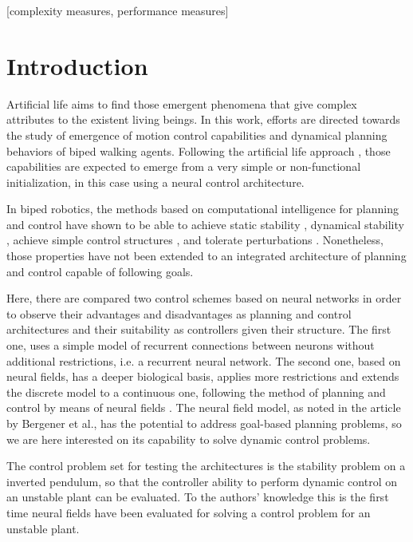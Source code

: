 \documentclass{sig-alternate}
\begin{document}
[complexity measures, performance measures]



\section{Introduction}
Artificial life aims to find those emergent phenomena that give
complex attributes to the existent living beings. In this work,
efforts are directed towards the study of emergence of motion control
capabilities and dynamical planning behaviors of biped walking
agents. Following the artificial life approach
\cite{Nolfi04Evolutionary}, those capabilities are expected to emerge
from a very simple or non-functional initialization, in this case
using a neural control architecture.

In biped robotics, the methods based on computational intelligence for
planning and control have shown to be able to achieve static
stability \cite{Kun97Adaptive}, dynamical stability
\cite{Nakanishi2004b,Komatsu05Dynamic}, achieve simple control
structures \cite{Huelse04Structure}, and tolerate perturbations
\cite{Juang02Intelligent}. Nonetheless, those properties have not been
extended to an integrated architecture of planning and control capable
of following goals.

Here, there are compared two control schemes based on neural networks
in order to observe their advantages and disadvantages as planning and
control architectures and their suitability as controllers given their
structure. The first one, uses a simple model of recurrent connections
between neurons without additional restrictions, i.e. a recurrent
neural network. The second one, based on neural fields, has a deeper
biological basis, applies more restrictions and extends the discrete
model to a continuous one, following the method of planning and
control by means of neural fields \cite{Bergener99Complex}. The neural
field model, as noted in the article by Bergener et al., has the
potential to address goal-based planning problems, so we are here
interested on its capability to solve dynamic control problems.

The control problem set for testing the architectures is the stability
problem on a inverted pendulum, so that the controller ability to
perform dynamic control on an unstable plant can be evaluated. To the
authors' knowledge this is the first time neural fields have been
evaluated for solving a control problem for an unstable plant.
\end{document}
